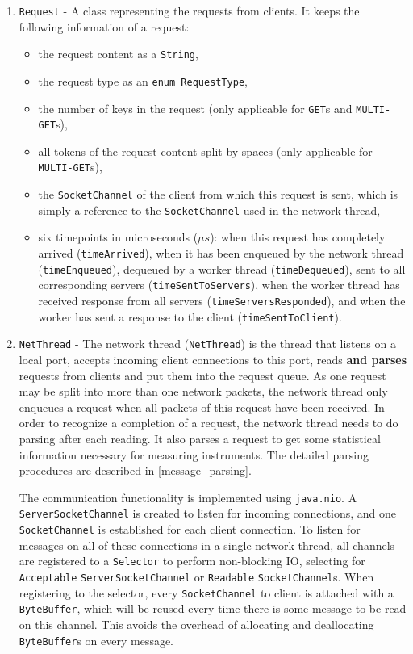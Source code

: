 \begin{enumerate}[noitemsep,topsep=0pt]
\item \texttt{Request} - A class representing the requests from clients. It keeps the following information of a request:
\begin{itemize}
\item the request content as a \texttt{String},
\item the request type as an \texttt{enum RequestType}, 
\item the number of keys in the request (only applicable for \texttt{GET}s and \texttt{MULTI-GET}s), 
\item all tokens of the request content split by spaces (only applicable for \texttt{MULTI-GET}s),
\item the \texttt{SocketChannel} of the client from which this request is sent, which is simply a reference to the \texttt{SocketChannel} used in the network thread,
\item six timepoints in microseconds ($\mu s$): when this request has completely arrived (\texttt{timeArrived}), when it has been enqueued by the network thread (\texttt{timeEnqueued}), dequeued by a worker thread (\texttt{timeDequeued}), sent to all corresponding servers (\texttt{timeSentToServers}), when the worker thread has received response from all servers (\texttt{timeServersResponded}), and when the worker has sent a response to the client (\texttt{timeSentToClient}).
\end{itemize}

\item \texttt{NetThread} - The network thread (\texttt{NetThread}) is the thread that listens on a local port, accepts incoming client connections to this port, reads \textbf{and parses} requests from clients and put them into the request queue. As one request may be split into more than one network packets, the network thread only enqueues a request when all packets of this request have been received. In order to recognize a completion of a request, the network thread needs to do parsing after each reading. It also parses a request to get some statistical information necessary for measuring instruments. The detailed parsing procedures are described in \ref{message_parsing}.

The communication functionality is implemented using \texttt{java.nio}. A \texttt{ServerSocketChannel} is created to listen for incoming connections, and one \texttt{SocketChannel} is established for each client connection. To listen for messages on all of these connections in a single network thread, all channels are registered to a \texttt{Selector} to perform non-blocking IO, selecting for \texttt{Acceptable} \texttt{ServerSocketChannel} or \texttt{Readable} \texttt{SocketChannel}s. When registering to the selector, every \texttt{SocketChannel} to client is attached with a \texttt{ByteBuffer}, which will be reused every time there is some message to be read on this channel. This avoids the overhead of allocating and deallocating \texttt{ByteBuffer}s on every message.


\end{enumerate}
